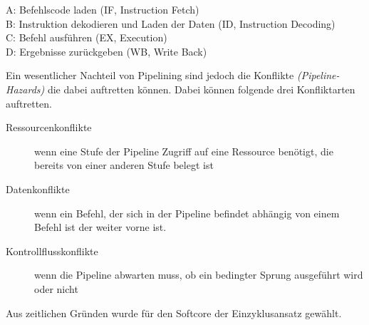            \begin{description}
                \item[A: Befehlscode laden (IF, Instruction Fetch)] 
                \item[B: Instruktion dekodieren und Laden der Daten (ID, Instruction Decoding)] 
                \item[C: Befehl ausführen (EX, Execution)] 
                \item[D: Ergebnisse zurückgeben (WB, Write Back)] 
            \end{description}
            Ein wesentlicher Nachteil von Pipelining sind jedoch die Konflikte \textit{(Pipeline-Hazards)}
            die dabei auftretten können. Dabei können folgende drei Konfliktarten auftretten.

            \begin{description}
                \item[Ressourcenkonflikte] wenn eine Stufe der Pipeline Zugriff auf eine Ressource benötigt, die bereits von einer anderen Stufe belegt ist 
                \item[Datenkonflikte] wenn ein Befehl, der sich in der Pipeline befindet abhängig von einem Befehl ist der weiter vorne ist.
                \item[Kontrollflusskonflikte] wenn die Pipeline abwarten muss, ob ein bedingter Sprung ausgeführt wird oder nicht
            \end{description}
            Aus zeitlichen Gründen wurde für den Softcore der Einzyklusansatz gewählt.
            

            

            



            
    
        

    

